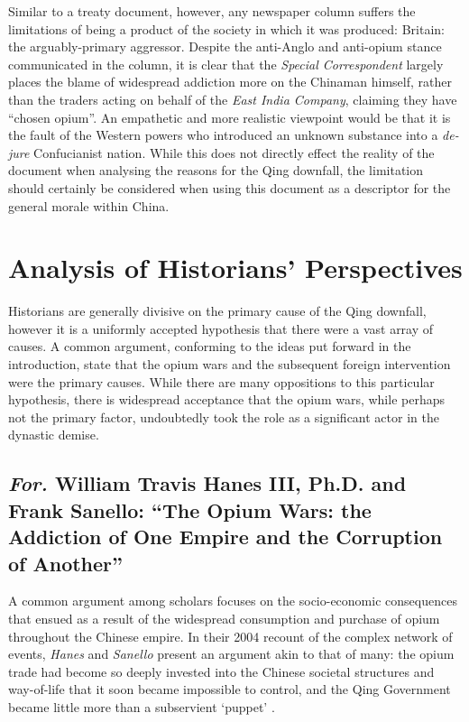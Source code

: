 \documentclass{article}
\begin{document}
        Similar to a treaty document, however, any newspaper column suffers the limitations of being a product of the society in which it was produced: Britain: the arguably-primary aggressor. Despite the anti-Anglo and anti-opium stance communicated in the column, it is clear that the \textit{Special Correspondent} largely places the blame of widespread addiction more on the Chinaman himself, rather than the traders acting on behalf of the \textit{East India Company}, claiming they have ``chosen opium''. An empathetic and more realistic viewpoint would be that it is the fault of the Western powers who introduced an unknown substance into a \textit{de-jure} Confucianist \autocite{Billioud:2007} nation. While this does not directly effect the reality of the document when analysing the reasons for the Qing downfall, the limitation should certainly be considered when using this document as a descriptor for the general morale within China.

\section{Analysis of Historians' Perspectives}

        Historians are generally divisive on the primary cause of the Qing downfall, however it is a uniformly accepted hypothesis that there were a vast array of causes. A common argument, conforming to the ideas put forward in the introduction, state that the opium wars and the subsequent foreign intervention were the primary causes. While there are many oppositions to this particular hypothesis, there is widespread acceptance that the opium wars, while perhaps not the primary factor, undoubtedly took the role as a significant actor in the dynastic demise.

\subsection{\emph{For.} William Travis Hanes III, Ph.D. and Frank Sanello: ``The Opium Wars: the Addiction of One Empire and the Corruption of Another''}

        A common argument among scholars focuses on the socio-economic consequences that ensued as a result of the widespread consumption and purchase of opium throughout the Chinese empire. In their 2004 recount of the complex network of events, \textit{Hanes} and \textit{Sanello} present an argument akin to that of many: the opium trade had become so deeply invested into the Chinese societal structures and way-of-life that it soon became impossible to control, and the Qing Government became little more than a subservient `puppet' \autocite{Li:2004}. 
\end{document}
